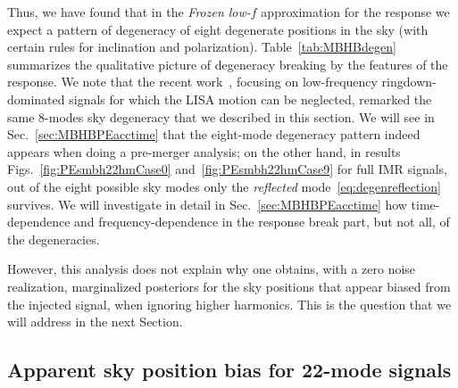 \documentclass[aps,showpacs,twocolumn,prd,superscriptaddress,nofootinbib]{revtex4-1}
\begin{document}
Thus, we have found that in the \textit{Frozen low-$f$} approximation for the response we expect a pattern of degeneracy of eight degenerate positions in the sky (with certain rules for inclination and polarization). Table~\ref{tab:MBHBdegen} summarizes the qualitative picture of degeneracy breaking by the features of the response. We note that the recent work~\cite{Baibhav+20}, focusing on low-frequency ringdown-dominated signals for which the LISA motion can be neglected, remarked the same 8-modes sky degeneracy that we described in this section. We will see in Sec.~\ref{sec:MBHBPEacctime} that the eight-mode degeneracy pattern indeed appears when doing a pre-merger analysis; on the other hand, in results Figs.~\ref{fig:PEsmbh22hmCase0} and~\ref{fig:PEsmbh22hmCase9} for full IMR signals, out of the eight possible sky modes only the \textit{reflected} mode~\eqref{eq:degenreflection} survives. We will investigate in detail in Sec.~\ref{sec:MBHBPEacctime} how time-dependence and frequency-dependence in the response break part, but not all, of the degeneracies. 

However, this analysis does not explain why one obtains, with a zero noise realization, marginalized posteriors for the sky positions that appear biased from the injected signal, when ignoring higher harmonics. This is the question that we will address in the next Section.


\subsection{Apparent sky position bias for 22-mode signals}
\label{subsec:MBHBPEdegen22}
\end{document}
